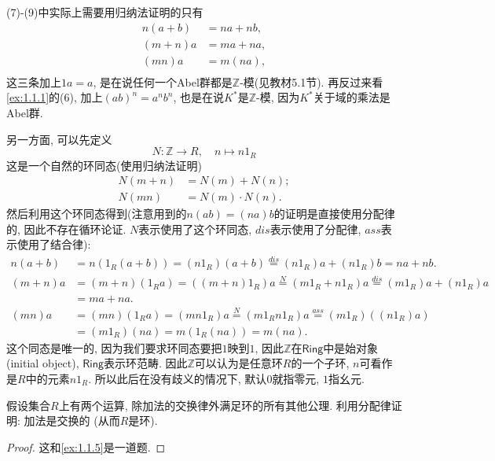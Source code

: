 \begin{remark}
    (7)-(9)中实际上需要用归纳法证明的只有
    \[
    \begin{aligned}
        n(a + b) &= na + nb,\\
        (m + n)a &= ma + na,\\
        (mn)a &= m(na),\\
    \end{aligned}
    \]
    这三条加上$1a = a$, 是在说任何一个Abel群都是$\mathbb{Z}$-模(见教材5.1节). 再反过来看\ref{ex:1.1.1}的(6), 加上$(ab)^n = a^nb^n$, 也是在说$K^*$是$\mathbb{Z}$-模, 因为$K^*$关于域的乘法是Abel群.
    
    另一方面, 可以先定义
    \[
        N: \mathbb{Z} \to R,\quad n \mapsto n1_R
    \]
    这是一个自然的环同态(使用归纳法证明)
    \[
    \begin{aligned}
        N(m + n) &= N(m) + N(n);\\
        N(mn) &= N(m) \cdot N(n).
    \end{aligned}
    \]
    然后利用这个环同态得到(注意用到的$n(ab) = (na)b$的证明是直接使用分配律的, 因此不存在循环论证. $N$表示使用了这个环同态, $dis$表示使用了分配律, $ass$表示使用了结合律):
    \[
    \begin{aligned}
        n(a + b) &= n(1_R(a + b)) = (n1_R)(a + b) \overset{dis}= (n1_R)a + (n1_R)b = na + nb.\\
        (m + n)a &= (m + n)(1_Ra) = ((m + n)1_R)a \overset{N}= (m1_R + n1_R)a \overset{dis}= (m1_R)a + (n1_R)a\\
        &= ma + na.\\
        (mn)a &= (mn)(1_Ra) = (mn1_R)a \overset{N}= (m1_Rn1_R)a \overset{ass}= (m1_R)((n1_R)a)\\
        &= (m1_R)(na) = m(1_R(na)) = m(na).
    \end{aligned}
    \]
    这个同态是唯一的, 因为我们要求环同态要把$1$映到$1$, 因此$\mathbb{Z}$在$\mathsf{Ring}$中是始对象(initial object), $\mathsf{Ring}$表示环范畴. 因此$\mathbb{Z}$可以认为是任意环$R$的一个子环, $n$可看作是$R$中的元素$n1_R$. 所以此后在没有歧义的情况下, 默认$0$就指零元, $1$指幺元.
\end{remark}

\begin{problem}
    假设集合$R$上有两个运算, 除加法的交换律外满足环的所有其他公理. 利用分配律证明: 加法是交换的 (从而$R$是环).
\end{problem}

\begin{proof}
    这和\ref{ex:1.1.5}是一道题.
\end{proof}

